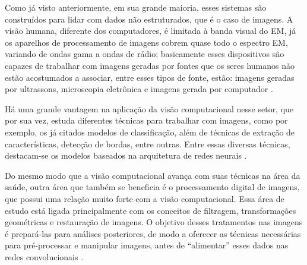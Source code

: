 Como já visto anteriormente, em sua grande maioria, esses sistemas são construídos para lidar com dados não estruturados, que é o caso de imagens. A visão humana, diferente dos computadores, é limitada à banda visual do \ac{EM}, já os aparelhos de processamento de imagens cobrem quase todo o espectro EM, variando de ondas gama a ondas de rádio; basicamente esses dispositivos são capazes de trabalhar com imagens geradas por fontes que os seres humanos não estão acostumados a associar, entre esses tipos de fonte, estão: imagens geradas por ultrassons, microscopia eletrônica e imagens gerada por computador \cite{gonzalez2008digital}. 


Há uma grande vantagem na aplicação da visão computacional nesse setor, que por sua vez, estuda diferentes técnicas para trabalhar com imagens, como por exemplo, os já citados modelos de classificação, além de técnicas de extração de características, detecção de bordas, entre outras. Entre essas diversas técnicas, destacam-se os modelos baseados na arquitetura de redes neurais \cite{DOI2007198}.


Do mesmo modo que a visão computacional avança com suas técnicas na área da saúde, outra área que também se beneficia é o processamento digital de imagens, que possui uma relação muito forte com a visão computacional. Essa área de estudo está ligada principalmente com os conceitos de filtragem, transformações geométricas e restauração de imagens. O objetivo desses tratamentos nas imagens é prepará-las para análises posteriores, de modo a oferecer as técnicas necessárias para pré-processar e manipular imagens, antes de “alimentar” esses dados nas redes convolucionais \cite{gonzalez2008digital}.


